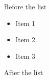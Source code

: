 Before the list

\begin{itemize}\item Item 1



\item Item 2



\item Item 3



\end{itemize}After the list

